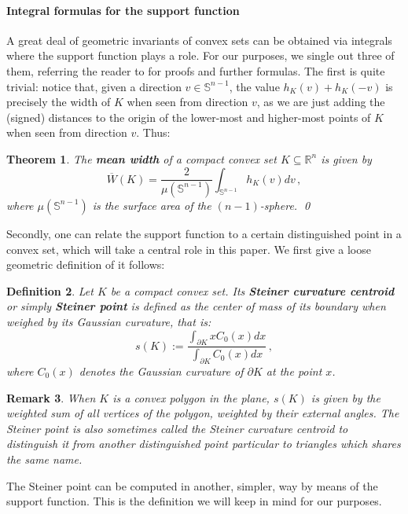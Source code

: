 \documentclass[a4paper]{article}
\newtheorem{theorem}{Theorem}[section]
\newtheorem{definition}[theorem]{Definition}
\newtheorem{remark}[theorem]{Remark}
\newcommand{\bb}{\mathbb}
\begin{document}
\paragraph{Integral formulas for the support function}

A great deal of geometric invariants of convex sets can be obtained via integrals where the support function plays a role. For our purposes, we single out three of them, referring the reader to \cite{schneider2013convex} for proofs and further formulas. The first is quite trivial: notice that, given a direction $v \in \bb S^{n-1}$, the value $h_K(v)+h_K(-v)$ is precisely the width of $K$ when seen from direction $v$, as we are just adding the (signed) distances to the origin of the lower-most and higher-most points of $K$ when seen from direction $v$. Thus:
\begin{theorem}
	\label{meanwidth}
	The \textbf{mean width} of a compact convex set $K \subseteq \bb R^n$ is given by
	\[ \overline W(K)=\frac{2}{\mu(\bb S^{n-1})}\int_{\bb S^{n-1}} h_K(v) dv \, ,\]
	where $\mu(\bb S^{n-1})$ is the surface area of the $(n-1)$-sphere. \qed
\end{theorem}

Secondly, one can relate the support function to a certain distinguished point in a convex set, which will take a central role in this paper. We first give a loose geometric definition of it follows:
\begin{definition}
	Let $K$ be a compact convex set. Its \textbf{Steiner curvature centroid} or simply \textbf{Steiner point} is defined as the center of mass of its boundary when weighed by its Gaussian curvature, that is:
	\[ s(K):= \frac{\int_{\partial K} xC_0(x) dx}{\int_{\partial K} C_0(x) dx}\, , \]
	where $C_0(x)$ denotes the Gaussian curvature of $\partial K$ at the point $x$.
\end{definition}
\begin{remark}
	
	When $K$ is a convex polygon in the plane, $s(K)$ is given by the weighted sum of all vertices of the polygon, weighted by their external angles. The Steiner point is also sometimes called the \emph{Steiner curvature centroid} to distinguish it from another distinguished point particular to triangles which shares the same name.
\end{remark}

The Steiner point can be computed in another, simpler, way by means of the support function. This is the definition we will keep in mind for our purposes.
\end{document}
